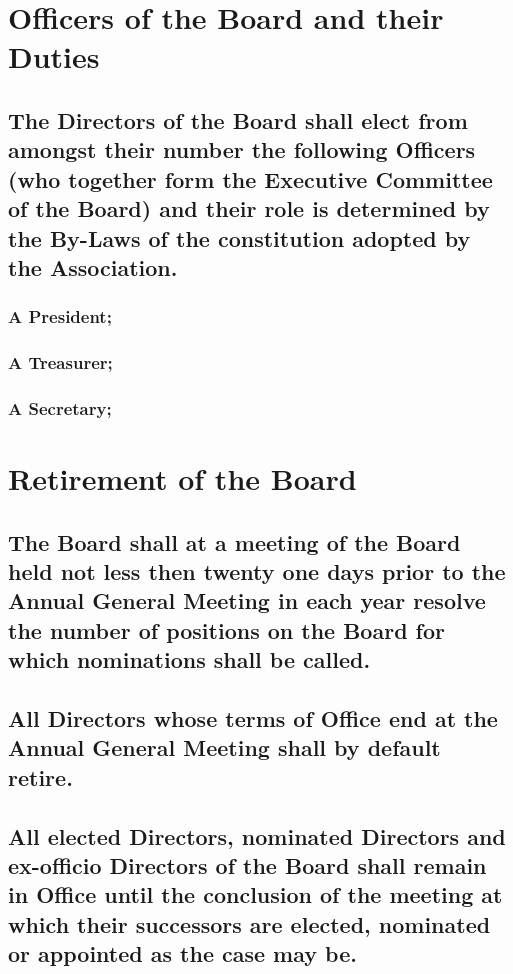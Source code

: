 \documentclass{article}
\newenvironment{subs}
  {\adjustwidth{2em}{0pt}}
  {\endadjustwidth}
\begin{document}
\section{Officers of the Board and their Duties}
\begin{subs}
\subsection{The Directors of the Board shall elect from amongst their number the following Officers (who together form the Executive Committee of the
Board) and their role is determined by the By-Laws of the constitution adopted by the Association.}
\begin{subs}
\subsubsection{A President;}
\subsubsection{A Treasurer;}
\subsubsection{A Secretary;}

\section{Retirement of the Board}
\begin{subs}
\subsection{The Board shall at a meeting of the Board held not less then twenty one days prior to the Annual General Meeting in each year resolve the number of positions on the Board for which nominations shall be called.}
\subsection{All Directors whose terms of Office end at the Annual General Meeting shall by default retire.}
\subsection{All elected Directors, nominated Directors and ex-officio Directors of the Board shall remain in Office until the conclusion of the meeting at which their successors are elected, nominated or appointed as the case may be.}
\end{subs}


\end{subs}
\end{subs}
\end{document}
